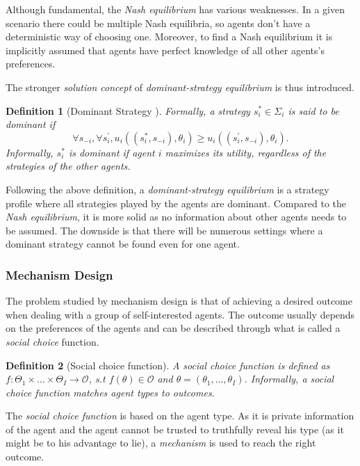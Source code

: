 \documentclass[12pt, a4paper]{article}
\newtheorem{Def}{Definition}[subsection]
\begin{document}
Although fundamental, the \emph{Nash equilibrium} has various weaknesses.
In a given scenario there could be multiple Nash equilibria, so agents
don't have a deterministic way of choosing one. Moreover, to find a Nash
equilibrium it is implicitly assumed that agents have perfect knowledge 
of all other agents's preferences.

The stronger \emph{solution concept} of \emph{dominant-strategy equilibrium}
is thus introduced.

\begin{Def}[Dominant Strategy \cite{weiss}] 
    Formally, a strategy $s_i^* \in \Sigma_i$ is said to be \emph{dominant} if
    $$\forall s_{-i}, \forall s_i^{'}, u_i((s_i^*, s_{-i}),\theta_i)
    \ge u_i((s_i^{'}, s_{-i}),\theta_i).$$
    Informally, $s_i^*$ is \emph{dominant} if agent $i$ maximizes
    its utility, regardless of the strategies of the other agents.
\end{Def}

Following the above definition, a \emph{dominant-strategy equilibrium} is a
strategy profile where all strategies played by the agents are dominant.
Compared to the \emph{Nash equilibrium}, it is more solid as no information
about other agents needs to be assumed. The downside is that there will
be numerous settings where a dominant strategy cannot be found even for
one agent.

\subsubsection{Mechanism Design}

The problem studied by mechanism design is that of achieving a desired
outcome when dealing with a group of self-interested agents. The outcome
usually depends on the preferences of the agents and can be described 
through what is called a \emph{social choice} function.

\begin{Def}[Social choice function]
    A social choice function is defined as $f:\Theta_1 \times \dots \times \Theta_I \rightarrow \mathcal{O}$, s.t $f(\theta) \in \mathcal{O}$ and $\theta=(\theta_1,\dots,\theta_I)$.
    Informally, a social choice function matches agent types to outcomes.
\end{Def}

The \emph{social choice function} is based on the agent type. As it is
private information of the agent and the agent cannot be trusted to
truthfully reveal his type (as it might be to his advantage to lie),
a \emph{mechanism} is used to reach the right outcome.
\end{document}
